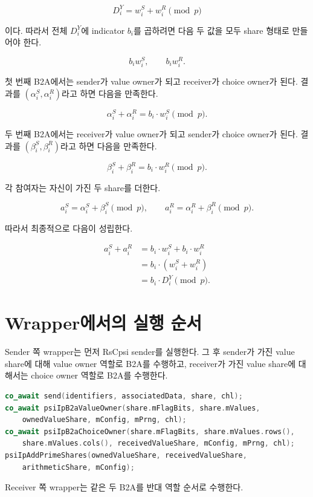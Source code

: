 \documentclass[11pt]{article}
\begin{document}
\[
  D_i^Y=w_i^S+w_i^R \pmod p
\]

이다. 따라서 전체 \(D_i^Y\)에 indicator \(b_i\)를 곱하려면 다음 두 값을 모두
share 형태로 만들어야 한다.

\[
  b_iw_i^S, \qquad b_iw_i^R.
\]

첫 번째 B2A에서는 sender가 value owner가 되고 receiver가 choice owner가 된다.
결과를 \((\alpha_i^S,\alpha_i^R)\)라고 하면 다음을 만족한다.

\[
  \alpha_i^S + \alpha_i^R = b_i \cdot w_i^S \pmod p.
\]

두 번째 B2A에서는 receiver가 value owner가 되고 sender가 choice owner가 된다.
결과를 \((\beta_i^S,\beta_i^R)\)라고 하면 다음을 만족한다.

\[
  \beta_i^S + \beta_i^R = b_i \cdot w_i^R \pmod p.
\]

각 참여자는 자신이 가진 두 share를 더한다.

\[
  a_i^S = \alpha_i^S + \beta_i^S \pmod p,
  \qquad
  a_i^R = \alpha_i^R + \beta_i^R \pmod p.
\]

따라서 최종적으로 다음이 성립한다.

\[
\begin{aligned}
  a_i^S+a_i^R
  &= b_i\cdot w_i^S + b_i\cdot w_i^R \\
  &= b_i\cdot (w_i^S+w_i^R) \\
  &= b_i\cdot D_i^Y \pmod p.
\end{aligned}
\]

\section*{Wrapper에서의 실행 순서}

Sender 쪽 wrapper는 먼저 RsCpsi sender를 실행한다. 그 후 sender가 가진 value share에
대해 value owner 역할로 B2A를 수행하고, receiver가 가진 value share에 대해서는 choice
owner 역할로 B2A를 수행한다.

\begin{lstlisting}[language=C++]
co_await send(identifiers, associatedData, share, chl);
co_await psiIpB2aValueOwner(share.mFlagBits, share.mValues,
    ownedValueShare, mConfig, mPrng, chl);
co_await psiIpB2aChoiceOwner(share.mFlagBits, share.mValues.rows(),
    share.mValues.cols(), receivedValueShare, mConfig, mPrng, chl);
psiIpAddPrimeShares(ownedValueShare, receivedValueShare,
    arithmeticShare, mConfig);
\end{lstlisting}

Receiver 쪽 wrapper는 같은 두 B2A를 반대 역할 순서로 수행한다.
\end{document}
